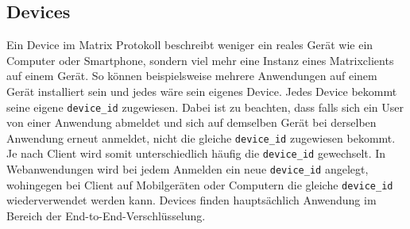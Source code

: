     \subsection{Devices}
    Ein Device im Matrix Protokoll beschreibt weniger ein reales Gerät wie ein Computer oder Smartphone, sondern viel mehr eine Instanz eines Matrixclients auf einem Gerät.
    So können beispielsweise mehrere Anwendungen auf einem Gerät installiert sein und jedes wäre sein eigenes Device.
    Jedes Device bekommt seine eigene \texttt{device\_id} zugewiesen.
    Dabei ist zu beachten, dass falls sich ein User von einer Anwendung abmeldet und sich auf demselben Gerät bei derselben Anwendung erneut anmeldet, nicht die gleiche \texttt{device\_id} zugewiesen bekommt.
    Je nach Client wird somit unterschiedlich häufig die \texttt{device\_id} gewechselt.
    In Webanwendungen wird bei jedem Anmelden ein neue \texttt{device\_id} angelegt, wohingegen bei Client auf Mobilgeräten oder Computern die gleiche \texttt{device\_id} wiederverwendet werden kann.
    Devices finden hauptsächlich Anwendung im Bereich der End-to-End-Verschlüsselung.

    \newpage
